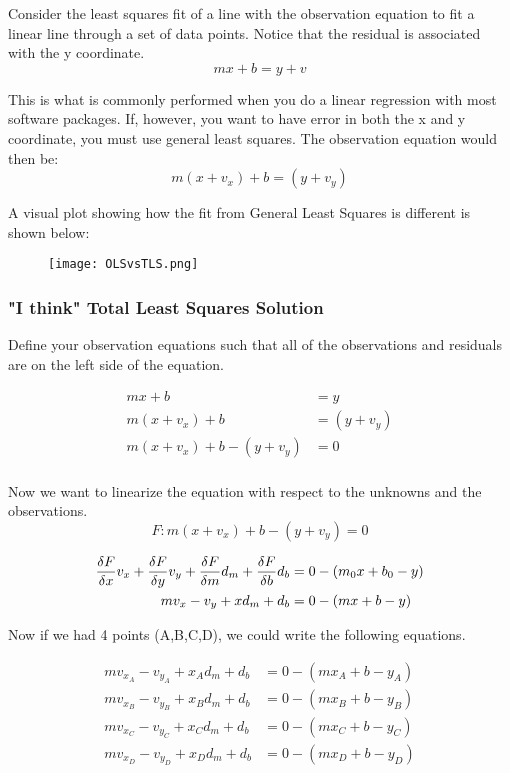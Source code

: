 Consider the least squares fit of a line with the observation equation to fit a linear line through a set of data points.  Notice that the residual is associated with the y coordinate.
\[
mx+b = y + v
\]

This is what is commonly performed when you do a linear regression with most software packages.  If, however, you want to have error in both the x and y coordinate, you must use general least squares.  The observation equation would then be: 
\[
m(x+v_x) + b = (y + v_y)
\]

A visual plot showing how the fit from General Least Squares is different is shown below:
\begin{figure}[H]
	\centering
	\texttt{[image: OLSvsTLS.png]}
\end{figure}


\subsubsection*{"I think" Total Least Squares Solution}
Define your observation equations such that all of the observations and residuals are on the left side of the equation.

\begin{align*}
mx + b &= y \\
m(x+v_x) + b &= (y+v_y) \\
m(x+v_x) + b - (y+v_y) &= 0 \\
\end{align*}

Now we want to linearize the equation with respect to the unknowns and the observations.  
\[
F: m(x+v_x) + b - (y+v_y) = 0
\]

\begin{align*}
\frac{\delta F}{\delta x}v_x + \frac{\delta F}{\delta y}v_y + \frac{\delta F}{\delta m}d_m + \frac{\delta F}{\delta b}d_b &= 0 - (m_0x+b_0-y) \\
mv_x -v_y + xd_m + d_b &= 0 - (mx+b-y) \\
\end{align*}

Now if we had 4 points (A,B,C,D), we could write the following equations.

\begin{align*}
mv_{x_A} -v_{y_A} + x_Ad_m + d_b &= 0 - (mx_A+b-y_A) \\
mv_{x_B} -v_{y_B} + x_Bd_m + d_b &= 0 - (mx_B+b-y_B) \\
mv_{x_C} -v_{y_C} + x_Cd_m + d_b &= 0 - (mx_C+b-y_C) \\
mv_{x_D} -v_{y_D} + x_Dd_m + d_b &= 0 - (mx_D+b-y_D) \\
\end{align*}

